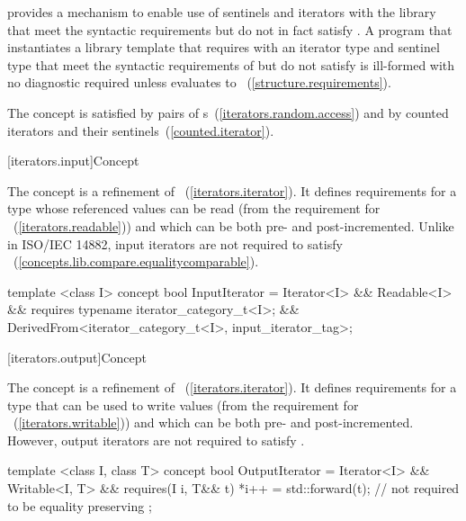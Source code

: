 \pnum
\enternote {} provides a mechanism to
enable use of sentinels and iterators with the library that meet the
syntactic requirements but do not in fact satisfy .
A program that instantiates a library template that requires
 with an iterator type  and sentinel type
 that meet the syntactic requirements of 
but do not satisfy  is ill-formed with no diagnostic required
unless  evaluates to
~(\ref{structure.requirements}). \exitnote

\pnum
\enternote The 
concept is satisfied by pairs of
s~(\ref{iterators.random.access}) and by
counted iterators and their sentinels~(\ref{counted.iterator}).\exitnote

[iterators.input]{Concept }

\pnum
The  concept is a refinement of
~(\ref{iterators.iterator}). It
defines requirements for a type whose referenced values can be read (from the requirement for
~(\ref{iterators.readable})) and which can be both pre- and post-incremented.
\enternote Unlike in ISO/IEC 14882, input iterators are not required to satisfy
~(\ref{concepts.lib.compare.equalitycomparable}).\exitnote

%
\begin{codeblock}
  template <class I>
  concept bool InputIterator =
    Iterator<I> &&
    Readable<I> &&
    requires { typename iterator_category_t<I>; } &&
    DerivedFrom<iterator_category_t<I>, input_iterator_tag>;
\end{codeblock}

[iterators.output]{Concept }

\pnum
The  concept is a refinement of
~(\ref{iterators.iterator}). It defines requirements for a type that
can be used to write values (from the requirement for
~(\ref{iterators.writable})) and which can be both pre- and post-incremented.
However, output iterators are not required to
satisfy .

%
\begin{codeblock}
  template <class I, class T>
  concept bool OutputIterator =
    Iterator<I> && Writable<I, T> &&
    requires(I i, T&& t) {
      *i++ = std::forward(t); // not required to be equality preserving
    };
\end{codeblock}

